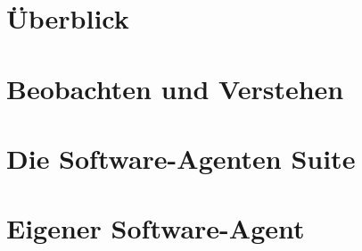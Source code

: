 \documentclass{article}
\begin{document}
  
  
  
  
  
  
  
  \section{Überblick}
  \label{sec:uberblick}
  
  
  
  \clearpage
  
  \section{Beobachten und Verstehen}
  \label{sec:beobachten_und_verstehen}
  
  
  \clearpage
  
  
  \clearpage
  
  \section{Die Software-Agenten Suite}
  \label{sec:die_software_agenten_suite}
  
  
  
  
  \clearpage
  
  \section{Eigener Software-Agent}
  \label{sec:eigener_software-agent}
  
  
  
  
\end{document}
